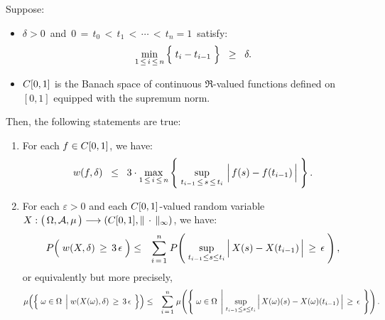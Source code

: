 \begin{proposition}
\mbox{}\vskip 0.2cm
\noindent
Suppose:
\begin{itemize}
\item	$\delta > 0$\, and \,$0 \,=\, t_{0} \,<\, t_{1} \,<\, \cdots \,<\, t_{n} = 1$\, satisfy:
		\begin{equation*}
		\min_{1\,\leq\,i\,\leq\,n}\left\{\;\overset{{\color{white}.}}{t}_{i} - t_{i-1}\;\right\}
		\;\; \geq \;\; \delta.
		\end{equation*}
\item	$C[0,1]$ is the Banach space of continuous $\Re$-valued functions defined on $[0,1]$
		equipped with the supremum norm.
\end{itemize}
Then, the following statements are true:
\begin{enumerate}
\item	For each $f \in C[0,1]$, we have:
		\begin{equation*}
		w(f,\delta) \;\; \leq \;\; 3 \cdot
			\max_{1\,\leq\,i\,\leq\,n}\left\{\;
				\sup_{t_{i-1}\,\leq\,s\,\leq\,t_{i}}\,\left\vert\,\overset{{\color{white}.}}{f}(s) - f(t_{i-1})\,\right\vert
			\;\right\}.
		\end{equation*}
\item	For each $\varepsilon > 0$ and each $C[0,1]$-valued random variable
		$X : \left(\,\Omega,\mathcal{A},\overset{{\color{white}.}}{\mu}\,\right) \longrightarrow \left(\Czo,\Vert\,\cdot\,\Vert_{\infty}\right)$,
		we have:
		\begin{eqnarray*}
		P\!\left(\;\overset{{\color{white}1}}{w}(X,\delta)\,\geq\,3\,\epsilon\;\right)
		&\leq& \overset{n}{\underset{i\,=\,1}{\sum}}\;
			P\!\left(\;
				\underset{t_{i-1}\leq s \leq t_{i}}{\sup}\left\vert\,\overset{{\color{white}.}}{X}(s)-X(t_{i-1})\,\right\vert\,\geq\,\epsilon
				\;\right),
		\end{eqnarray*}
		or equivalently but more precisely,
		\begin{eqnarray*}
		\mu\!\left(\left\{\;\omega\in\Omega\;\left\vert\;\overset{{\color{white}1}}{w}(X(\omega),\delta)\,\geq\,3\,\epsilon\right.\;\right\}\right)
		&\leq& \overset{n}{\underset{i\,=\,1}{\sum}}\;
			\mu\!\left(\left\{\; \omega\in\Omega \;\left\vert\;
				\underset{t_{i-1}\leq s \leq t_{i}}{\sup}\left\vert\,\overset{{\color{white}.}}{X}(\omega)(s)-X(\omega)(t_{i-1})\,\right\vert\,\geq\,\epsilon
				\right.\;\right\}\right).
		\end{eqnarray*}
\end{enumerate}
\end{proposition}

